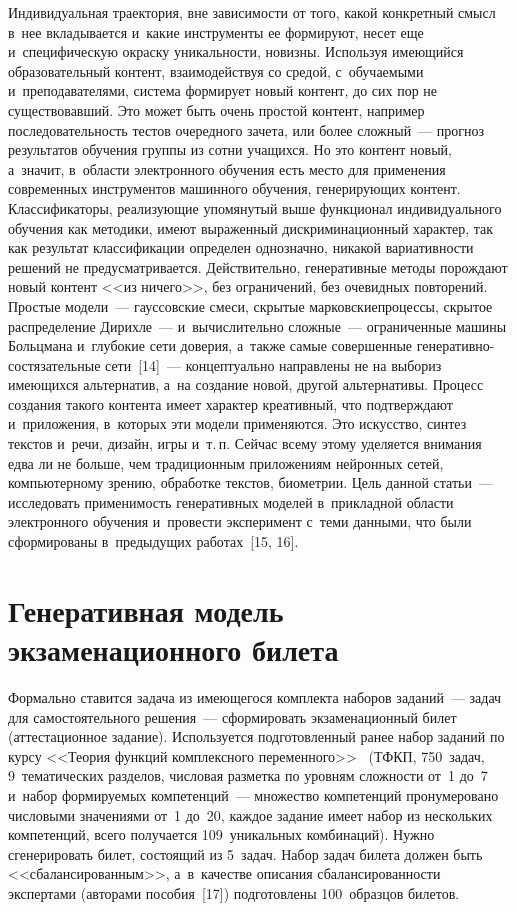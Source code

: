 \begin{multicols}{2}
  
  Индивидуальная траектория, вне зависимости от того, какой конкретный 
смысл в~нее вкладывается и~какие инструменты ее формируют, несет еще 
и~специфическую окраску уникальности, новизны. Используя име\-ющий\-ся 
образовательный контент, взаимодействуя со средой, с~обуча\-емы\-ми 
и~преподавателями, система формирует новый контент, до сих пор не 
существовавший. Это может быть очень простой контент, например 
последовательность тес\-тов очередного зачета, или более сложный~--- 
прогноз результатов обучения группы из сотни учащихся. Но это контент 
новый, а~значит, в~об\-ласти электронного обуче\-ния есть место для 
применения современных инструментов машинного обуче\-ния, 
генерирующих контент. Классификаторы, реализующие упомянутый выше 
функционал индивидуального обучения как методики, имеют выраженный 
дискриминационный характер, так как результат классификации определен 
однозначно, никакой вариативности решений не предусматривается. 
Действительно, генеративные методы порождают новый контент <<из 
ничего>>, без ограничений, без очевидных повторений. Простые модели~--- 
гауссовские смеси, скрытые марковские\linebreak процессы, скрытое распределение 
Дирихле~--- и~вычислительно сложные~--- ограниченные машины\linebreak 
Больцмана и~глубокие сети доверия, а~также самые совершенные 
ге\-не\-ра\-тив\-но-со\-стя\-за\-тель\-ные сети~[14]~--- концептуально направлены не на 
выбор\linebreak из име\-ющих\-ся альтернатив, а~на создание новой, другой 
альтернативы. Процесс создания такого контента имеет характер 
креативный, что под\-тверж\-да\-ют и~приложения, в~которых эти модели 
применяются. Это искусство, синтез текс\-тов и~речи, дизайн, игры и~т.\,п. 
Сейчас всему этому уделяется внимания едва ли не больше, чем 
традиционным приложениям нейронных сетей, компьютерному зрению, 
обработке текс\-тов, био\-мет\-рии. Цель данной статьи~--- исследовать 
применимость генеративных моделей в~при\-клад\-ной об\-ласти электронного 
обуче\-ния и~провести эксперимент с~теми данными, что были сформированы 
в~предыдущих работах~[15, 16].

\section{Генеративная модель экзаменационного билета}

  Формально ставится задача из имеющегося комплекта наборов заданий~--- 
задач для самостоятельного решения~--- сформировать экзаменационный 
билет (аттестационное задание). Используется подготовленный ранее набор 
заданий по курсу <<Теория функций комплексного  
переменного>>~\cite{15-bos} (ТФКП, 750~задач, 9~тематических разделов, 
числовая разметка по уровням слож\-ности от~1 до~7 и~набор формируемых 
компетенций~--- множество компетенций пронумеровано числовыми 
значениями от~1 до~20, каждое задание имеет набор из нескольких 
компетенций, всего получается 109~уникальных комбинаций). Нужно 
сгенерировать билет, состоящий из 5~задач. Набор задач билета должен быть 
<<сбалансированным>>, а~в~качестве описания сбалансированности 
экспертами (авторами пособия~[17]) подготовлены 100~образцов билетов.


\end{multicols}
